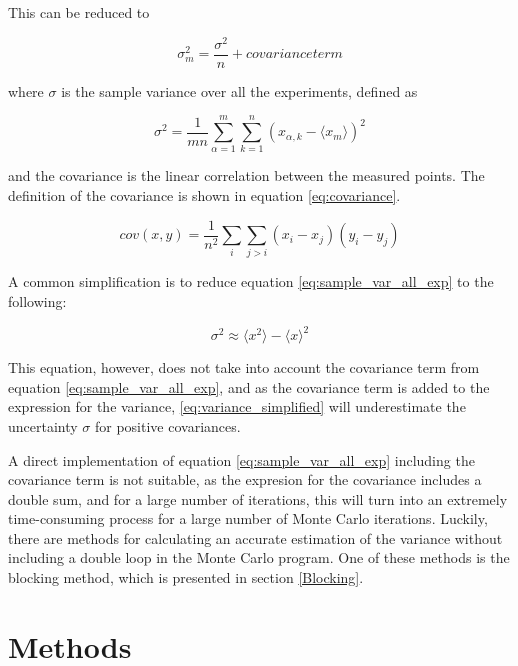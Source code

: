 \documentclass[norsk,a4paper,12pt]{article}
\begin{document}
This can be reduced to 

\begin{equation}
\label{eq:sample_var_all_exp}
\sigma_m^2 = \frac{\sigma^2}{n} + covariance term
\end{equation}

where $\sigma$ is the sample variance over all the experiments, defined as 

\begin{equation}
\sigma^2 = \frac{1}{mn} \sum_{\alpha=1}^m \sum_{k=1}^n (x_{\alpha, k} - \langle x_m \rangle )^2
\end{equation}

and the covariance is the linear correlation between the measured points. The definition of the covariance is shown in equation \ref{eq:covariance}.

\begin{equation}
cov(x,y) = \frac{1}{n^2} \sum_i \sum_{j >i} (x_i - x_j) (y_i - y_j)
\end{equation}

A common simplification is to reduce equation \ref{eq:sample_var_all_exp} to the following:

\begin{equation}
\label{eq:variance_simplified}
\sigma^2 \approx \langle x^2 \rangle - \langle x \rangle^2
\end{equation}

This equation, however, does not take into account the covariance term from equation \ref{eq:sample_var_all_exp}, and as the covariance term is added to the expression for the variance, \ref{eq:variance_simplified} will underestimate the uncertainty $\sigma$ for positive covariances.

A direct implementation of equation \ref{eq:sample_var_all_exp} including the covariance term is not suitable, as the expresion for the covariance includes a double sum, and for a large number of iterations, this will turn into an extremely time-consuming process for a large number of Monte Carlo iterations. Luckily, there are methods for calculating an accurate estimation of the variance without including a double loop in the Monte Carlo program. One of these methods is the blocking method, which is presented in section \ref{Blocking}.

\section{Methods}
\end{document}
